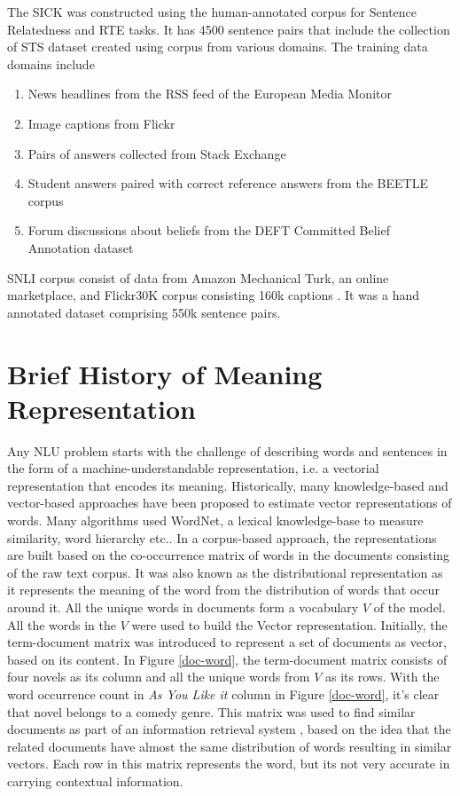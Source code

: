 \documentclass[12pt]{report} %
\begin{document}
The SICK \cite{marelli2014semeval}  was constructed using the human-annotated corpus for Sentence Relatedness and RTE tasks. It has 4500 sentence pairs that include the collection of STS dataset created using corpus from various domains. The training data domains include 
\begin{enumerate}
	\item News headlines from the RSS feed of the European Media Monitor
	\item Image captions from Flickr
	\item Pairs of answers collected from Stack Exchange
	\item Student answers paired with correct reference answers from the BEETLE corpus
	\item Forum discussions about beliefs from the DEFT Committed Belief Annotation dataset
\end{enumerate}

  SNLI corpus consist of data from Amazon Mechanical Turk, an online marketplace, and Flickr30K corpus consisting 160k captions \citep{bowman2015large}. It was a hand annotated dataset comprising 550k sentence pairs.

\section{Brief History of Meaning Representation}

Any NLU problem starts with the challenge of describing words and sentences in the form of a machine-understandable representation, i.e. a vectorial representation that encodes its meaning. Historically, many knowledge-based and vector-based approaches have been proposed to estimate vector representations of words. Many algorithms used WordNet, a lexical knowledge-base to measure similarity, word hierarchy etc.. In a corpus-based approach, the representations are built based on the co-occurrence matrix of words in the documents consisting of the raw text corpus. It was also known as the distributional representation as it represents the meaning of the word from the distribution of words that occur around it. All the unique words in documents form a vocabulary $V$ of the model. All the words in the $V$ were used to build the Vector representation. Initially, the term-document matrix was introduced to represent a set of documents as vector, based on its content. In Figure \ref{doc-word}, the term-document matrix consists of four novels as its column and all the unique words from $V$ as its rows. With the word occurrence count in \textit{As You Like it} column in Figure \ref{doc-word}, it's clear that novel belongs to a comedy genre.  This matrix was used to find similar documents as part of an information retrieval system \citep{salton1971smart}, based on the idea that the related documents have almost the same distribution of words resulting in similar vectors.  Each row in this matrix represents the word, but its not very accurate in carrying contextual information. 
\end{document}
